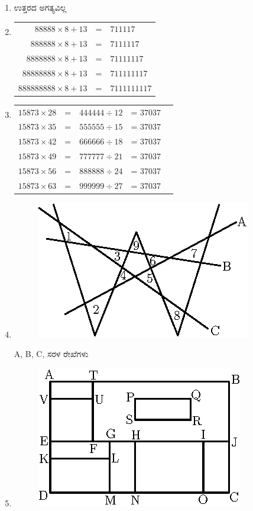 \begin{enumerate}
\item ಉತ್ತರದ ಅಗತ್ಯವಿಲ್ಲ

\item
\begin{tabular}[t]{rcl}
$88888\times 8 + 13$ & = & $711117$\\
$888888\times 8 + 13$ & = & $7111117$\\
$8888888\times 8 + 13$ & = & $71111117$\\
$88888888\times 8 + 13$ & = & $711111117$\\
$888888888\times 8 + 13$ & = & $7111111117$
\end{tabular}

\item
\begin{tabular}[t]{lllll}
$15873\times 28$ & = & $444444\div 12$ & = $37037$\\
$15873\times 35$ & = & $555555\div 15$ & = $37037$\\
$15873\times 42$ & = & $666666\div 18$ & = $37037$\\
$15873\times 49$ & = & $777777\div 21$ & = $37037$\\
$15873\times 56$ & = & $888888\div 24$ & = $37037$\\
$15873\times 63$ & = & $999999\div 27$ & = $37037$
\end{tabular}

\item
\begin{figure}[H]
\centering
\includegraphics{images/chap6/ans14.eps}
\end{figure}

A, B, C, ಸರಳ ರೇಖೆಗಳು 

\item
\begin{figure}[H]
\centering
\includegraphics{images/chap6/ans15.eps}
\end{figure}


\end{enumerate}
